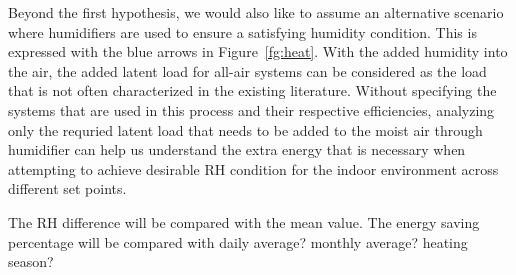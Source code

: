     Beyond the first hypothesis, we would also like to assume an alternative scenario where humidifiers are used to ensure a satisfying humidity condition. This is expressed with the blue arrows in Figure~\ref{fg:heat}. With the added humidity into the air, the added latent load for all-air systems can be considered as the load that is not often characterized in the existing literature. Without specifying the systems that are used in this process and their respective efficiencies, analyzing only the requried latent load that needs to be added to the moist air through humidifier can help us understand the extra energy that is necessary when attempting to achieve desirable RH condition for the indoor environment across different set points. 

    The RH difference will be compared with the mean value. The energy saving percentage will be compared with daily average? monthly average? heating season? 

